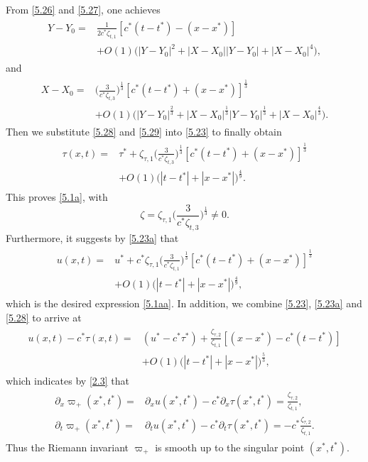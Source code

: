 \documentclass[11pt,reqno]{article}
\newcommand{\fr}{\frac}
\newcommand{\pa}{\partial}
\numberwithin{equation}{section}
\begin{document}
From \eqref{5.26} and \eqref{5.27}, one achieves
\begin{align}\label{5.28}
\begin{split}
Y-Y_0=&\fr{1}{2c^*\zeta_{t,1}}[c^*(t-t^*)-(x-x^*)] \\
&+O(1)\Big(|Y-Y_0|^2 +|X-X_0||Y-Y_0|+|X-X_0|^4\Big),
\end{split}
\end{align}
and
\begin{align}\label{5.29}
\begin{split}
X-X_0=&\Big(\fr{3}{c^*\zeta_{t,3}}\Big)^{\fr{1}{3}}[c^*(t-t^*)+(x-x^*)]^{\fr{1}{3}} \\
&+O(1)\Big(|Y-Y_0|^{\fr{2}{3}} +|X-X_0|^{\fr{1}{3}}|Y-Y_0|^{\fr{1}{3}}+|X-X_0|^{\fr{4}{3}}\Big).
\end{split}
\end{align}
Then we substitute \eqref{5.28} and \eqref{5.29} into \eqref{5.23} to finally obtain
\begin{align}\label{5.30}
\begin{split}
\tau(x,t)=&\tau^* +\zeta_{\tau,1}\Big(\fr{3}{c^*\zeta_{t,3}}\Big)^{\fr{1}{3}}[c^*(t-t^*)+(x-x^*)]^{\fr{1}{3}} \\
&+O(1)\Big(|t-t^*|+|x-x^*|\Big)^{\fr{4}{9}}.
\end{split}
\end{align}
This proves \eqref{5.1a}, with
$$
\zeta=\zeta_{\tau,1}\Big(\fr{3}{c^*\zeta_{t,3}}\Big)^{\fr{1}{3}}\neq0.
$$
Furthermore, it suggests by \eqref{5.23a} that
\begin{align}\label{5.30b}
\begin{split}
u(x,t)=&u^* +c^*\zeta_{\tau,1}\Big(\fr{3}{c^*\zeta_{t,1}}\Big)^{\fr{1}{3}}[c^*(t-t^*)+(x-x^*)]^{\fr{1}{3}} \\
&+O(1)\Big(|t-t^*|+|x-x^*|\Big)^{\fr{4}{9}},
\end{split}
\end{align}
which is the desired expression \eqref{5.1aa}. In addition, we combine \eqref{5.23}, \eqref{5.23a} and \eqref{5.28} to arrive at
\begin{align}\label{5.30c}
\begin{split}
u(x,t)-c^*\tau(x,t)=&(u^*-c^*\tau^*) +\fr{\zeta_{\tau,2}}{\zeta_{t,1}}[(x-x^*)-c^*(t-t^*)] \\
&+O(1)\Big(|t-t^*|+|x-x^*|\Big)^{\fr{5}{3}},
\end{split}
\end{align}
which indicates by \eqref{2.3} that
\begin{align}\label{5.30d}
\begin{split}
\pa_x\varpi_+(x^*, t^*)=&\pa_xu(x^*,t^*)-c^*\pa_x\tau(x^*,t^*)=\fr{\zeta_{\tau,2}}{\zeta_{t,1}}, \\
\pa_t\varpi_+(x^*, t^*)=&\pa_tu(x^*,t^*)-c^*\pa_t\tau(x^*,t^*)=-c^*\fr{\zeta_{\tau,2}}{\zeta_{t,1}}.
\end{split}
\end{align}
Thus the Riemann invariant $\varpi_+$ is smooth up to the singular point $(x^*, t^*)$.
\end{document}
